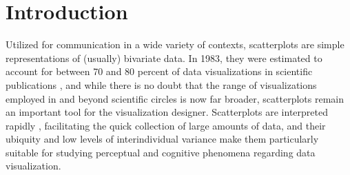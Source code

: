 \documentclass[sigconf]{acmart}
\begin{document}



\maketitle

\setlength{\parskip}{-0.1pt}

\section{Introduction}\label{sec-intro}

Utilized for communication in a wide variety of contexts, scatterplots
are simple representations of (usually) bivariate data. In 1983, they
were estimated to account for between 70 and 80 percent of data
visualizations in scientific publications \citep{tufte_1983}, and while
there is no doubt that the range of visualizations employed in and
beyond scientific circles is now far broader, scatterplots remain an
important tool for the visualization designer. Scatterplots are
interpreted rapidly \citep{rensink_2014}, facilitating the quick
collection of large amounts of data, and their ubiquity
\citep{tufte_1983} and low levels of interindividual variance
\citep{kay_2015} make them particularly suitable for studying perceptual
and cognitive phenomena regarding data visualization.
\end{document}

